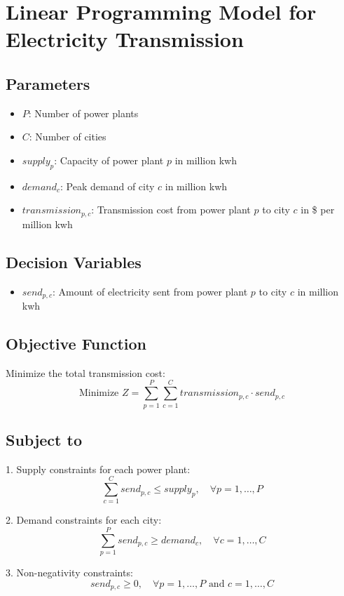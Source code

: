 \documentclass{article}
\begin{document}
\section*{Linear Programming Model for Electricity Transmission}

\subsection*{Parameters}
\begin{itemize}
    \item $P$: Number of power plants
    \item $C$: Number of cities
    \item $supply_{p}$: Capacity of power plant $p$ in million kwh
    \item $demand_{c}$: Peak demand of city $c$ in million kwh
    \item $transmission_{p,c}$: Transmission cost from power plant $p$ to city $c$ in \$ per million kwh
\end{itemize}

\subsection*{Decision Variables}
\begin{itemize}
    \item $send_{p,c}$: Amount of electricity sent from power plant $p$ to city $c$ in million kwh
\end{itemize}

\subsection*{Objective Function}
Minimize the total transmission cost:
\[
\text{Minimize } Z = \sum_{p=1}^{P} \sum_{c=1}^{C} transmission_{p,c} \cdot send_{p,c}
\]

\subsection*{Subject to}
1. Supply constraints for each power plant:
\[
\sum_{c=1}^{C} send_{p,c} \leq supply_{p}, \quad \forall p = 1, \ldots, P
\]

2. Demand constraints for each city:
\[
\sum_{p=1}^{P} send_{p,c} \geq demand_{c}, \quad \forall c = 1, \ldots, C
\]

3. Non-negativity constraints:
\[
send_{p,c} \geq 0, \quad \forall p = 1, \ldots, P \text{ and } c = 1, \ldots, C
\]
\end{document}

